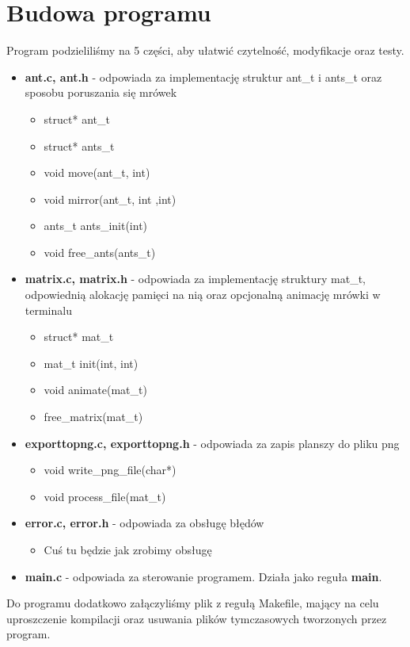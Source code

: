 \documentclass[a4paper,12pt]{article}
\begin{document}
\section{Budowa programu}
Program podzieliliśmy na 5 części, aby ułatwić czytelność, modyfikacje oraz testy.
\begin{itemize}
\item \textbf{ant.c, ant.h} - odpowiada za implementację struktur ant\_t i ants\_t oraz sposobu poruszania się mrówek 
\begin{itemize}
\item struct* ant\_t
\item struct* ants\_t
\item void move(ant\_t, int)
\item void mirror(ant\_t, int ,int)
\item ants\_t ants\_init(int)
\item void free\_ants(ants\_t)
\end{itemize}
\newpage
\item \textbf{matrix.c, matrix.h} - odpowiada za implementację struktury mat\_t, odpowiednią alokację pamięci na nią oraz opcjonalną animację mrówki w terminalu
\begin{itemize}
\item struct* mat\_t
\item mat\_t init(int, int)
\item void animate(mat\_t)
\item free\_matrix(mat\_t)
\end{itemize}
\item \textbf{exporttopng.c, exporttopng.h} - odpowiada za zapis planszy do pliku png
\begin{itemize}
\item void write\_png\_file(char*)
\item void process\_file(mat\_t)
\end{itemize} 
\item \textbf{error.c, error.h} - odpowiada za obsługę błędów
\begin{itemize}
\item Cuś tu będzie jak zrobimy obsługę
\end{itemize}
\item \textbf{main.c} - odpowiada za sterowanie programem. Działa jako reguła \textbf{main}.
\end{itemize}
Do programu dodatkowo załączyliśmy plik z regułą Makefile, mający na celu uproszczenie kompilacji oraz usuwania plików tymczasowych tworzonych przez program.
\end{document}
